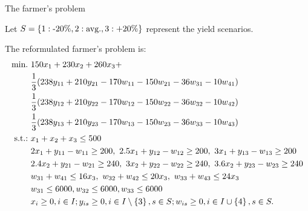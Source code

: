 \begin{frame}{The farmer's problem {\small \cite{birge2011introduction}}}
	
	Let $S = \left\{ 1: \text{-20\%}, 2: \text{avg.}, 3:\text{+20\%} \right \}$ represent the \alert{yield scenarios}. 
	
	The reformulated farmer's problem is:
	{\small
	\begin{align*}
		\mathop{\text{min.} \ } & 150x_1 + 230 x_2 + 260 x_3 +~ \\
		& \frac{1}{3} (238 y_{11} + 210 y_{21} - 170 w_{11} - 150 w_{21} - 36 w_{31} - 10w_{41})\\
		& \frac{1}{3} (238 y_{12} + 210 y_{22} - 170 w_{12} - 150 w_{22} - 36 w_{32} - 10w_{42})\\
		& \frac{1}{3} (238 y_{13} + 210 y_{23} - 170 w_{13} - 150 w_{23} - 36 w_{33} - 10w_{43})\\
		\text{s.t.:~} & x_1 + x_2 + x_3 \le 500 \\
		&2x_1 + y_{11} - w_{11} \ge 200, \ 2.5x_1 + y_{12} - w_{12} \ge 200, \ 3x_1 + y_{13} - w_{13} \ge 200 \\
		& 2.4 x_2 + y_{21} - w_{21} \ge 240, \ 3 x_2 + y_{22} - w_{22} \ge 240, \ 3.6 x_2 + y_{23} - w_{23} \ge 240 \\
		& w_{31} + w_{41} \le 16x_3, \ w_{32} + w_{42} \le 20x_3, \ w_{33} + w_{43} \le 24x_3 \\
		& w_{31} \le 6000, w_{32} \le 6000, w_{33} \le 6000 \\
		& x_i \ge 0, i \in I; y_{is} \ge 0, i \in I \setminus \left\{ 3 \right \}, s \in S; w_{is} \ge 0, i \in I \cup \left\{ 4 \right \}, s \in S.
	\end{align*}
	}
\end{frame}


